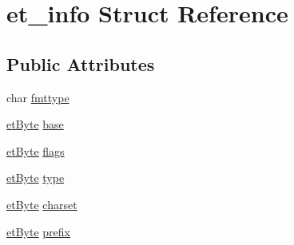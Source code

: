 \hypertarget{structet__info}{\section{et\-\_\-info Struct Reference}
\label{structet__info}
}
\subsection*{Public Attributes}
\begin{DoxyCompactItemize}
\item 
char \hyperlink{structet__info_a1740af27f0c9d5840e7dda59a129aa4b}{fmttype}
\item 
\hyperlink{sqlite3_8c_a91e852579d0a29e4b91b94e8e4d015b9}{et\-Byte} \hyperlink{structet__info_a20f5a4c11c7aa1d9c777805d11965c66}{base}
\item 
\hyperlink{sqlite3_8c_a91e852579d0a29e4b91b94e8e4d015b9}{et\-Byte} \hyperlink{structet__info_a8f11646aaec803f0870683dc3ba2f756}{flags}
\item 
\hyperlink{sqlite3_8c_a91e852579d0a29e4b91b94e8e4d015b9}{et\-Byte} \hyperlink{structet__info_a148bd1efa49018c9a723701ba5747825}{type}
\item 
\hyperlink{sqlite3_8c_a91e852579d0a29e4b91b94e8e4d015b9}{et\-Byte} \hyperlink{structet__info_a77131acb7479b0e6aad61af0901e11c2}{charset}
\item 
\hyperlink{sqlite3_8c_a91e852579d0a29e4b91b94e8e4d015b9}{et\-Byte} \hyperlink{structet__info_a23cc866bf202c34e49bd49599b051628}{prefix}
\end{DoxyCompactItemize}


